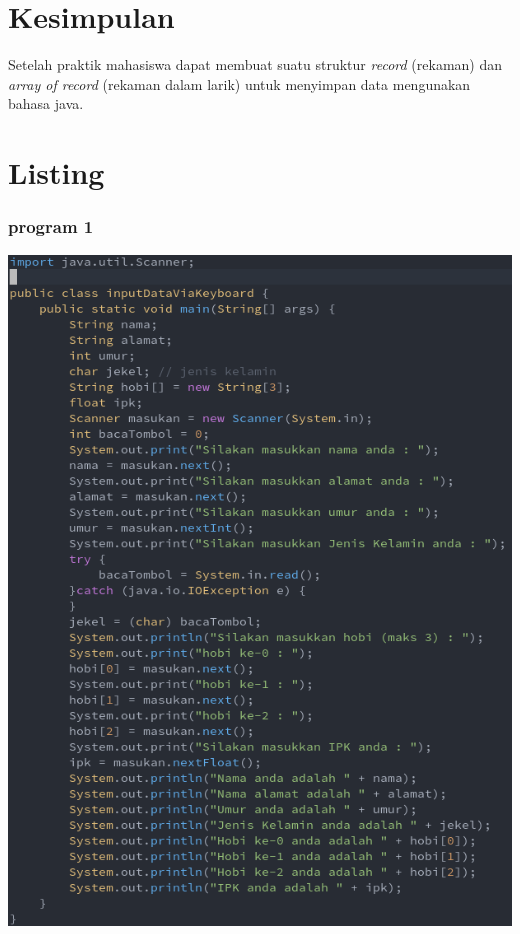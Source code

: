\documentclass[a4paper,12pt]{article}
\begin{document}
\newpage

\section{Kesimpulan}
Setelah praktik mahasiswa dapat membuat suatu struktur \textit{record} (rekaman) dan \textit{array of record}
(rekaman dalam larik) untuk menyimpan data mengunakan bahasa java.

\newpage
\section{Listing}
\subsubsection{program 1}
\begin{center}
    \includegraphics[scale=.5]{code01.png} 
\end{center}
\end{document}
